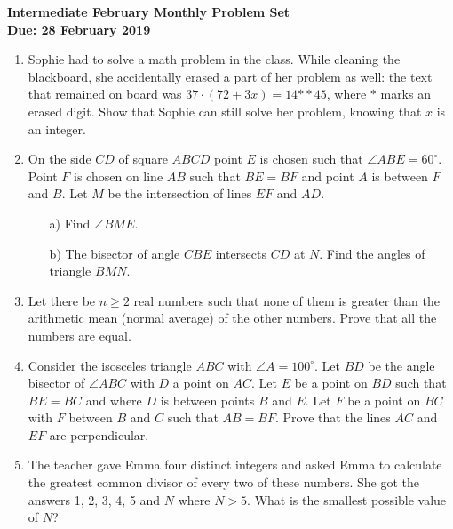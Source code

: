 \documentclass[a4paper,12pt,titlepage]{article}
\begin{document}
\begin{center}
\textbf{\Large Intermediate February Monthly Problem Set}
\\ \vspace{1em}
\textbf{\large Due: 28 February 2019}
\end{center}

\vspace{4pt}

\begin{enumerate}[1.]

\item %

Sophie had to solve a math problem in the class. While cleaning the blackboard, she accidentally erased a part of her problem as well: the text that remained on board was $37\cdot(72+3x)=14{**}45$, where $*$ marks an erased digit. Show that Sophie can still solve her problem, knowing that $x$ is an integer.


\item %
On the side $CD$ of square $ABCD$ point $E$ is chosen such that $\angle ABE = 60^{\circ}$. Point $F$ is chosen on line $AB$ such that $BE = BF$ and point $A$ is between $F$ and $B$. Let $M$ be the intersection of lines $EF$ and $AD$.
\begin{itemize}
\item [a)] Find $\angle BME$.
\item [b)] The bisector of angle $CBE$ intersects $CD$ at $N$. Find the angles of triangle $BMN$.
\end{itemize}


\item %
Let there be $n \geq 2$ real numbers such that none of them is greater than the arithmetic mean (normal average) of the other numbers. Prove that all the numbers are equal.


\item %
Consider the isosceles triangle $ABC$ with $\angle A = 100^{\circ}$. Let $BD$ be the angle bisector of $\angle ABC$ with $D$ a point on $AC$. Let $E$ be a point on $BD$ such that $BE=BC$ and where $D$ is between points $B$ and $E$. Let $F$ be a point on $BC$ with $F$ between $B$ and $C$ such that $AB=BF$. Prove that the lines $AC$ and $EF$ are perpendicular.


\item %
The teacher gave Emma four distinct integers and asked Emma to calculate the greatest common divisor of every two of these numbers. She got the answers 1, 2, 3, 4, 5 and $N$ where $N>5$. What is the smallest possible value of $N$?


\end{enumerate}
\end{document}
